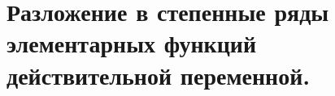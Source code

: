 {
	\section{Разложение в степенные ряды элементарных функций действительной переменной.}

	\newpage
}